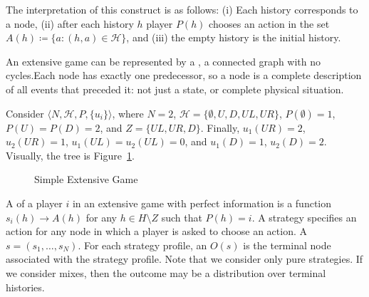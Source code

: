 \documentclass[10pt]{article}
\begin{document}
\begin{remark}
	The interpretation of this construct is as follows: (i) Each history corresponds to a node, (ii) after each history $h$ player $P(h)$ chooses an action in the set $A(h) \coloneqq \{a : (h,a) \in \mathcal{H}\}$, and (iii) the empty history is the initial history.
\end{remark}

\begin{definition}
	An extensive game can be represented by a , a connected graph with no cycles.Each node has exactly one predecessor, so a node is a complete description of all events that preceded it: not just a state, or complete physical situation.
\end{definition}

\begin{example}
	 Consider $\langle N,\mathcal{H},P,\{u_i\}\rangle$, where $N = 2$, $\mathcal{H} = \{\emptyset,U,D,UL,UR\}$, $P(\emptyset) = 1$, $P(U) = P(D) = 2$, and $Z = \{UL,UR,D\}$. Finally, $u_1(UR) = 2$, $u_2(UR) = 1$, $u_1(UL) = u_2(UL) = 0$, and $u_1(D) =1$, $u_2(D) =2$. Visually, the tree is Figure~\ref{fig:extensive_game_simple}.
	
	\begin{figure}[H]
		\centering
		\caption{Simple Extensive Game}
		\label{fig:extensive_game_simple}
	\end{figure}
\end{example}


\begin{definition}
	A  of a player $i$ in an extensive game with perfect information is a function $s_i(h) \to A(h)$ for any $h \in H \setminus Z$ such that $P(h) = i$. A strategy specifies an action for any node in which a player is asked to choose an action. A  $s = (s_1,\dots,s_N)$. For each strategy profile, an  $O(s)$ is the terminal node associated with the strategy profile. Note that we consider only pure strategies. If we consider mixes, then the outcome may be a distribution over terminal histories.
\end{definition}
\end{document}
